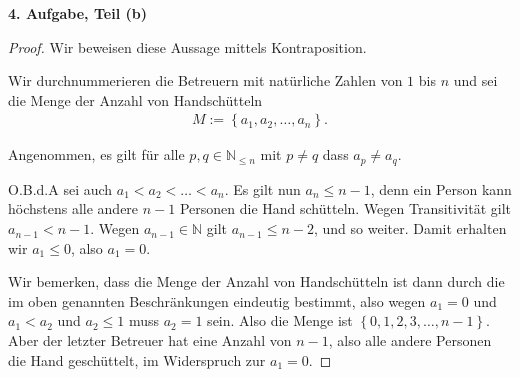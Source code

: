\documentclass[12pt]{extarticle}
\begin{document}
\textbf{4. Aufgabe, Teil (b)}
\begin{proof}
  Wir beweisen diese Aussage mittels Kontraposition.

  Wir durchnummerieren die Betreuern mit natürliche Zahlen von \(1\) bis
  \(n\) und sei die Menge der Anzahl von Handschütteln
\begin{align*}
M:= \left\{ a_1, a_2, \ldots, a_n \right\}.
\end{align*}

Angenommen, es gilt für alle \(p,q \in \mathbb{N}_{\leq n}\) mit $p \neq
q$ dass \(a_p \neq a_q\).

O.B.d.A sei auch \(a_1 < a_2 < \ldots < a_n\).  Es gilt nun $a_n \leq n
- 1$, denn ein Person kann höchstens alle andere \(n-1\) Personen die
Hand schütteln.  Wegen Transitivität gilt \(a_{n-1} < n - 1\).  Wegen
\(a_{n-1} \in \mathbb{N}\) gilt \(a_{n-1} \leq n-2\), und so weiter.
Damit erhalten wir \(a_1 \leq 0\), also \(a_1 = 0\).

Wir bemerken, dass die Menge der Anzahl von Handschütteln ist dann
durch die im oben genannten Beschränkungen eindeutig bestimmt, also
wegen \(a_1=0\) und \(a_1 < a_2\) und \(a_2 \leq 1\) muss \(a_2 = 1\) sein.
Also die Menge ist \(\left\{ 0, 1, 2, 3, \ldots, n-1 \right\}\).  Aber
der letzter Betreuer hat eine Anzahl von \(n-1\), also alle andere
Personen die Hand geschüttelt, im Widerspruch zur \(a_1=0\).
\end{proof}
\end{document}
